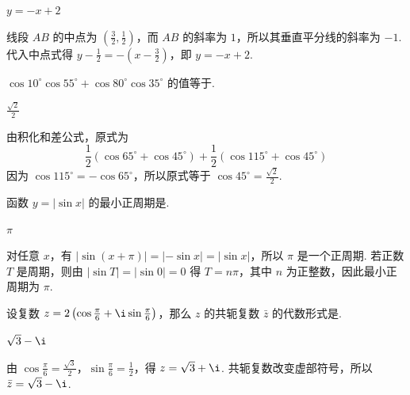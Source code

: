 \begin{answer}
\(y=-x+2\)
\end{answer}

\begin{solution}
线段 \(AB\) 的中点为 \(\left(\frac32,\frac12\right)\)，而 \(AB\) 的斜率为 \(1\)，所以其垂直平分线的斜率为 \(-1\). 代入中点式得 \(y-\frac12=-\left(x-\frac32\right)\)，即 \(y=-x+2\).
\end{solution}

\begin{problem}
\(\cos 10^\circ \cos 55^\circ + \cos 80^\circ \cos 35^\circ\) 的值等于\fillinblank{}.
\end{problem}

\begin{answer}
\(\frac{\sqrt2}{2}\)
\end{answer}

\begin{solution}
由积化和差公式，原式为
\[
\frac12\left(\cos65^\circ+\cos45^\circ\right)+\frac12\left(\cos115^\circ+\cos45^\circ\right)
\]
因为 \(\cos115^\circ=-\cos65^\circ\)，所以原式等于 \(\cos45^\circ=\frac{\sqrt2}{2}\).
\end{solution}

\begin{problem}
函数 \(y = |\sin x|\) 的最小正周期是\fillinblank{}.
\end{problem}

\begin{answer}
\(\pi\)
\end{answer}

\begin{solution}
对任意 \(x\)，有 \(|\sin(x+\pi)|=|{-\sin x}|=|\sin x|\)，所以 \(\pi\) 是一个正周期. 若正数 \(T\) 是周期，则由 \(|\sin T|=|\sin0|=0\) 得 \(T=n\pi\)，其中 \(n\) 为正整数，因此最小正周期为 \(\pi\).
\end{solution}

\begin{problem}
设复数 \(z = 2\left(\cos \frac{\pi}{6} + \i \sin \frac{\pi}{6}\right)\)，那么 \(z\) 的共轭复数 \(\bar{z}\) 的代数形式是\fillinblank{}.
\end{problem}

\begin{answer}
\(\sqrt3-\i\)
\end{answer}

\begin{solution}
由 \(\cos\frac\pi6=\frac{\sqrt3}{2}\)，\(\sin\frac\pi6=\frac12\)，得 \(z=\sqrt3+\i\). 共轭复数改变虚部符号，所以 \(\bar z=\sqrt3-\i\).
\end{solution}


